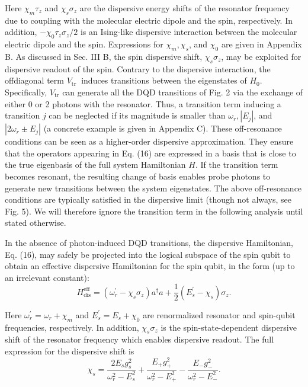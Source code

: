 \documentclass[12pt]{article}
\begin{document}
Here $\chi_m \tau_z$ and $\chi_s \sigma_z$ are the dispersive energy shifts of the resonator frequency due to coupling with the molecular electric dipole and the spin, respectively. In addition, $-\chi_0 \tau_z \sigma_z / 2$ is an Ising-like dispersive interaction between the molecular electric dipole and the spin. Expressions for $\chi_m, \chi_s$, and $\chi_0$ are given in Appendix B. As discussed in Sec. III B, the spin dispersive shift, $\chi_s \sigma_z$, may be exploited for dispersive readout of the spin. Contrary to the dispersive interaction, the offdiagonal term $V_{\text {tr }}$ induces transitions between the eigenstates of $H_0$. Specifically, $V_{\mathrm{tr}}$ can generate all the DQD transitions of Fig. 2 via the exchange of either 0 or 2 photons with the resonator. Thus, a transition term inducing a transition $j$ can be neglected if its magnitude is smaller than $\omega_r,\left|E_j\right|$, and $\left|2 \omega_r \pm E_j\right|$ (a concrete example is given in Appendix C). These off-resonance conditions can be seen as a higher-order dispersive approximation. They ensure that the operators appearing in Eq. (16) are expressed in a basis that is close to the true eigenbasis of the full system Hamiltonian $H$. If the transition term becomes resonant, the resulting change of basis enables probe photons to generate new transitions between the system eigenstates. The above off-resonance conditions are typically satisfied in the dispersive limit (though not always, see Fig. 5). We will therefore ignore the transition term in the following analysis until stated otherwise.

In the absence of photon-induced DQD transitions, the dispersive Hamiltonian, Eq. (16), may safely be projected into the logical subspace of the spin qubit to obtain an effective dispersive Hamiltonian for the spin qubit, in the form (up to an irrelevant constant):
$$
H_{\mathrm{dis}}^{\mathrm{eff}}=\left(\omega_r^{\prime}-\chi_s \sigma_z\right) a^{\dagger} a+\frac{1}{2}\left(E_s^{\prime}-\chi_s\right) \sigma_z .
$$

Here $\omega_r^{\prime}=\omega_r+\chi_m$ and $E_s^{\prime}=E_s+\chi_0$ are renormalized resonator and spin-qubit frequencies, respectively. In addition, $\chi_s \sigma_z$ is the spin-state-dependent dispersive shift of the resonator frequency which enables dispersive readout. The full expression for the dispersive shift is
$$
\chi_s=\frac{2 E_s g_s^2}{\omega_r^2-E_s^2}+\frac{E_{+} g_{+}^2}{\omega_r^2-E_{+}^2}-\frac{E_{-} g_{-}^2}{\omega_r^2-E_{-}^2} .
$$
\end{document}
